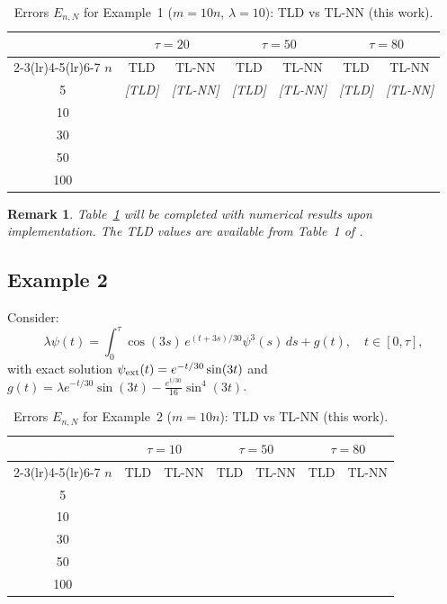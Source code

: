 \documentclass[12pt, a4paper]{article}
\newtheorem{remark}[theorem]{Remark}
\begin{document}
\begin{table}[H]
\centering
\caption{Errors $E_{n,N}$ for Example~1 ($m = 10n$,
$\lambda = 10$): TLD \cite{sedka2025} vs TL-NN (this work).}
\label{tab:ex1}
\begin{tabular}{c cc cc cc}
\toprule
& \multicolumn{2}{c}{$\tau = 20$}
& \multicolumn{2}{c}{$\tau = 50$}
& \multicolumn{2}{c}{$\tau = 80$} \\
\cmidrule(lr){2-3}\cmidrule(lr){4-5}\cmidrule(lr){6-7}
$n$ & TLD & TL-NN & TLD & TL-NN & TLD & TL-NN \\
\midrule
5   & \textit{[TLD]} & \textit{[TL-NN]} &
      \textit{[TLD]} & \textit{[TL-NN]} &
      \textit{[TLD]} & \textit{[TL-NN]} \\
10  & & & & & & \\
30  & & & & & & \\
50  & & & & & & \\
100 & & & & & & \\
\bottomrule
\end{tabular}
\end{table}

\begin{remark}
  Table~\ref{tab:ex1} will be completed with numerical
  results upon implementation.
  The TLD values are available from Table~1 of
  \cite{sedka2025}.
\end{remark}

\subsection{Example 2}

Consider:
\begin{equation}
  \lambda\psi(t) = \int_0^\tau
  \cos(3s) \, e^{(t+3s)/30} \psi^3(s)
  \, ds + g(t),
  \quad t \in [0, \tau],
  \label{eq:ex2}
\end{equation}
with exact solution $\psi_{\rm ext}(t) = e^{-t/30}\sin(3t)$
and $g(t) = \lambda e^{-t/30}\sin(3t)
- \frac{e^{t/30}}{16}\sin^4(3t)$.

\begin{table}[H]
\centering
\caption{Errors $E_{n,N}$ for Example~2 ($m = 10n$):
TLD \cite{sedka2025} vs TL-NN (this work).}
\label{tab:ex2}
\begin{tabular}{c cc cc cc}
\toprule
& \multicolumn{2}{c}{$\tau = 10$}
& \multicolumn{2}{c}{$\tau = 50$}
& \multicolumn{2}{c}{$\tau = 80$} \\
\cmidrule(lr){2-3}\cmidrule(lr){4-5}\cmidrule(lr){6-7}
$n$ & TLD & TL-NN & TLD & TL-NN & TLD & TL-NN \\
\midrule
5   & & & & & & \\
10  & & & & & & \\
30  & & & & & & \\
50  & & & & & & \\
100 & & & & & & \\
\bottomrule
\end{tabular}
\end{table}
\end{document}
